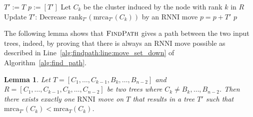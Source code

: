\documentclass{amsart}
\newcommand{\mrca}{\mathrm{mrca}}
\newcommand{\rank}{\mathrm{rank}}
\newcommand{\rnni}{\mathrm{RNNI}}
\newcommand{\findpath}{\textsc{FindPath}}
\newtheorem{lemma}[definition]{Lemma}
\begin{document}
\begin{algorithm}[H]
\caption{$\findpath$($T,R$)}
\label{alg:find_path}
\begin{algorithmic}[1]
\STATE $T' := T$
\STATE $p := [T']$
\STATE Let $C_k$ be the cluster induced by the node with rank $k$ in $R$ \label{alg:find_path:line:cluster}
\WHILE {$\rank_{T'}(\mrca_{T'}(C_k))>k$}
\STATE Update $T'$: Decrease $\rank_{T'}(\mrca_{T'}(C_k))$ by an $\rnni$ move \label{alg:findpath:line:move_set_down}
\STATE $p = p+T'$
\ENDWHILE
\ENDFOR
\RETURN $p$
\end{algorithmic}
\end{algorithm}

The following lemma shows that $\findpath$ gives a path between the two input trees, indeed, by proving that there is always an $\rnni$ move possible as described in Line~\ref{alg:findpath:line:move_set_down} of Algorithm~\ref{alg:find_path}.

\begin{lemma}
Let $T = [C_1, \ldots, C_{k-1}, B_{k}, \ldots, B_{n-2}]$ and $R = [C_1, \ldots, C_{k-1}, C_k, \ldots, C_{n-2}]$ be two trees where $C_k \neq B_k, \ldots, B_{n-2}$.
Then there exists exactly one $\rnni$ move on $T$ that results in a tree $T'$ such that $\mrca_{T'}(C_k) < \mrca_{T}(C_k)$.
\label{lemma:mrca_move}
\end{lemma}
\end{document}
